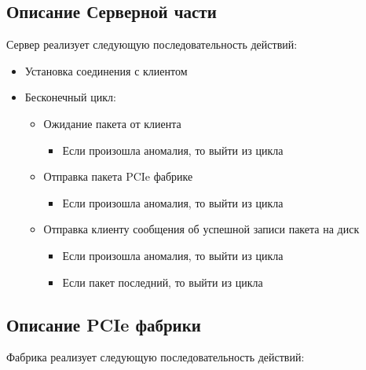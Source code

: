 \subsection{Описание Серверной части}

Сервер реализует следующую последовательность действий: 

\begin{itemize}
\item Установка соединения с клиентом
\item Бесконечный цикл:
	\begin{itemize}
		\item Ожидание пакета от клиента
		\begin{itemize}
			\item Если произошла аномалия, то выйти из цикла
		\end{itemize}
		
		\item Отправка пакета PCIe фабрике
		\begin{itemize}
			\item Если произошла аномалия, то выйти из цикла
		\end{itemize}		
		\item  Отправка клиенту сообщения об успешной записи пакета на диск 
		\begin{itemize}
			\item Если произошла аномалия, то выйти из цикла
		\end{itemize}
		\begin{itemize}
			\item Если пакет последний, то выйти из цикла
		\end{itemize}
	\end{itemize}
\end{itemize}

\subsection{Описание PCIe фабрики }

Фабрика реализует следующую последовательность действий: 


